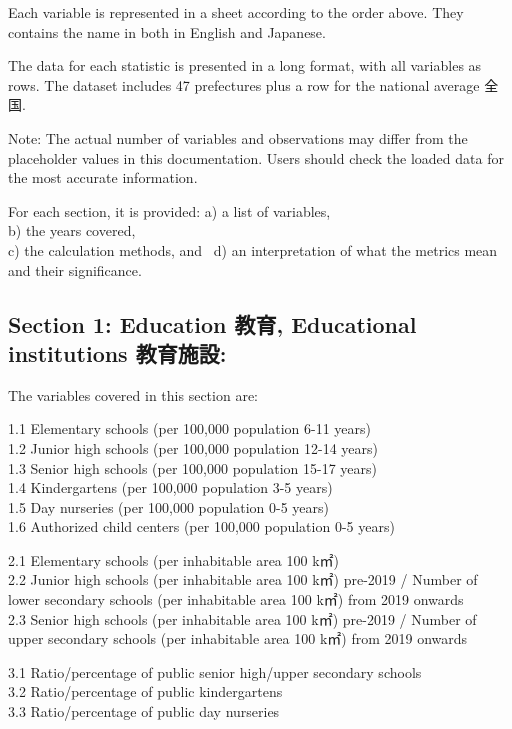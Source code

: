 \documentclass[
]{ltjarticle}
\begin{document}
Each variable is represented in a sheet according to the order above.
They contains the name in both in English and Japanese.

The data for each statistic is presented in a long format, with all
variables as rows. The dataset includes 47 prefectures plus a row for
the national average 全国.

Note: The actual number of variables and observations may differ from
the placeholder values in this documentation. Users should check the
loaded data for the most accurate information.

For each section, it is provided: a) a list of variables,\\
b) the years covered,\\
c) the calculation methods, and~ d) an interpretation of what the
metrics mean and their significance.

\hypertarget{section-1-education-ux6559ux80b2-educational-institutions-ux6559ux80b2ux65bdux8a2d}{%
\subsection{Section 1: Education 教育, Educational institutions
教育施設:}\label{section-1-education-ux6559ux80b2-educational-institutions-ux6559ux80b2ux65bdux8a2d}}

The variables covered in this section are:

1.1 Elementary schools (per 100,000 population 6-11 years)\\
1.2 Junior high schools (per 100,000 population 12-14 years)\\
1.3 Senior high schools (per 100,000 population 15-17 years)\\
1.4 Kindergartens (per 100,000 population 3-5 years)\\
1.5 Day nurseries (per 100,000 population 0-5 years)\\
1.6 Authorized child centers (per 100,000 population 0-5 years)

2.1 Elementary schools (per inhabitable area 100 k㎡)\\
2.2 Junior high schools (per inhabitable area 100 k㎡) pre-2019 / Number
of lower secondary schools (per inhabitable area 100 k㎡) from 2019
onwards\\
2.3 Senior high schools (per inhabitable area 100 k㎡) pre-2019 / Number
of upper secondary schools (per inhabitable area 100 k㎡) from 2019
onwards

3.1 Ratio/percentage of public senior high/upper secondary schools\\
3.2 Ratio/percentage of public kindergartens\\
3.3 Ratio/percentage of public day nurseries
\end{document}
